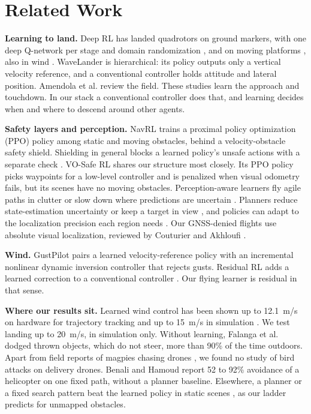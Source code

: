 \section{Related Work}

\textbf{Learning to land.} Deep RL has landed quadrotors on ground markers, with one deep Q-network per stage and domain randomization \cite{polvara2017,polvara2020}, and on moving platforms \cite{rodriguez2018}, also in wind \cite{peter2024}. WaveLander \cite{li2026wavelander} is hierarchical: its policy outputs only a vertical velocity reference, and a conventional controller holds attitude and lateral position. Amendola et al.  review the field. These studies learn the approach and touchdown. In our stack a conventional controller does that, and learning decides when and where to descend around other agents.

\textbf{Safety layers and perception.} NavRL \cite{xu2025navrl} trains a proximal policy optimization (PPO) policy \cite{schulman2017} among static and moving obstacles, behind a velocity-obstacle safety shield. Shielding in general blocks a learned policy's unsafe actions with a separate check \cite{alshiekh2018}. VO-Safe RL \cite{lin2024vosafe} shares our structure most closely. Its PPO policy picks waypoints for a low-level controller and is penalized when visual odometry fails, but its scenes have no moving obstacles. Perception-aware learners fly agile paths in clutter \cite{song2023} or slow down where predictions are uncertain \cite{kahn2017}. Planners reduce state-estimation uncertainty \cite{zhang2018} or keep a target in view \cite{falanga2018}, and policies can adapt to the localization precision each region needs \cite{puthumanaillam2024}. Our GNSS-denied flights use absolute visual localization, reviewed by Couturier and Akhloufi .

\textbf{Wind.} GustPilot \cite{habel2026gustpilot} pairs a learned velocity-reference policy with an incremental nonlinear dynamic inversion controller that rejects gusts. Residual RL adds a learned correction to a conventional controller \cite{johannink2019,silver2018}. Our flying learner is residual in that sense.

\textbf{Where our results sit.} Learned wind control has been shown up to 12.1~m/s on hardware for trajectory tracking \cite{oconnell2022} and up to 15~m/s in simulation \cite{altasim2026}. We test landing up to 20~m/s, in simulation only. Without learning, Falanga et al.  dodged thrown objects, which do not steer, more than 90\% of the time outdoors. Apart from field reports of magpies chasing drones \cite{lyons2018}, we found no study of bird attacks on delivery drones. Benali and Hamoud  report 52 to 92\% avoidance of a helicopter on one fixed path, without a planner baseline. Elsewhere, a planner or a fixed search pattern beat the learned policy in static scenes \cite{xu2025navrl,yao2026}, as our ladder predicts for unmapped obstacles.
